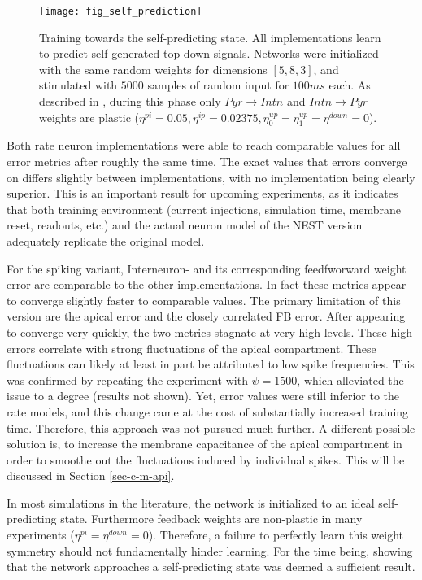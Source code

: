 \begin{figure}[h]
    \centering
    \texttt{[image: fig\_self\_prediction]}
    \caption[Training towards the self-predicting state]{Training towards the self-predicting state. All implementations
        learn to predict self-generated top-down signals. Networks were initialized with the same random weights for
        dimensions $[5, 8, 3]$, and stimulated with $5000$ samples of random input for $100ms$ each. As described in
        \citep{sacramento2018dendritic}, during this phase only $Pyr \rightarrow Intn$ and $Intn \rightarrow Pyr$
        weights are plastic ($\eta^{pi}=0.05, \eta^{ip}=0.02375, \eta^{up}_0=\eta^{up}_1=\eta^{down}=0$).}
    \label{fig-self-pred}
\end{figure}

Both rate neuron implementations were able to reach comparable values for all error metrics after roughly the same time.
The exact values that errors converge on differs slightly between implementations, with no implementation being clearly
superior. This is an important result for upcoming experiments, as it indicates that both training environment (current
injections, simulation time, membrane reset, readouts, etc.) and the actual neuron model of the NEST version adequately
replicate the original model.

For the spiking variant, Interneuron- and its corresponding feedfworward weight error are comparable to the other
implementations. In fact these metrics appear to converge slightly faster to comparable values. The primary limitation
of this version are the apical error and the closely correlated FB error. After appearing to converge very quickly, the
two metrics stagnate at very high levels. These high errors correlate with strong fluctuations of the apical
compartment. These fluctuations can likely at least in part be attributed to low spike frequencies. This was confirmed
by repeating the experiment with $\psi=1500$, which alleviated the issue to a degree (results not shown). Yet, error
values were still inferior to the rate models, and this change came at the cost of substantially increased training
time. Therefore, this approach was not pursued much further. A different possible solution is, to increase the membrane
capacitance of the apical compartment in order to smoothe out the fluctuations induced by individual spikes. This will
be discussed in Section \ref{sec-c-m-api}.

In most simulations in the literature, the network is initialized to an ideal self-predicting state. Furthermore
feedback weights are non-plastic in many experiments ($\eta^{pi}=\eta^{down}=0$). Therefore, a failure to perfectly
learn this weight symmetry should not fundamentally hinder learning. For the time being, showing that the network
approaches a self-predicting state was deemed a sufficient result.


